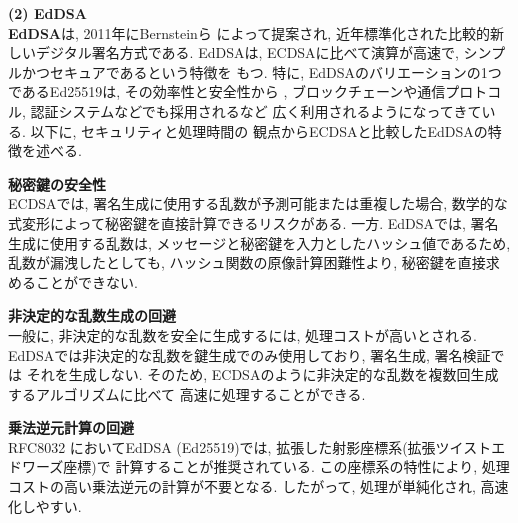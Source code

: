 \documentclass[a4j,9pt,twocolumn]{jsarticle}
\begin{document}
\noindent\textbf{(2) EdDSA}\\
\indent \textbf{EdDSA}は,  2011年にBernsteinら\cite{eddsa}
によって提案され, 近年標準化された比較的新しいデジタル署名方式である. 
EdDSAは, ECDSAに比べて演算が高速で, シンプルかつセキュアであるという特徴を
もつ. 特に, EdDSAのバリエーションの1つであるEd25519は, その効率性と安全性から
, ブロックチェーンや通信プロトコル, 認証システムなどでも採用されるなど
広く利用されるようになってきている. 以下に, セキュリティと処理時間の
観点からECDSAと比較したEdDSAの特徴を述べる.
\smallskip
\begin{description}[labelwidth=3mm, labelsep=2mm]
    \item[(i)] \textbf{秘密鍵の安全性}\\
    ECDSAでは, 署名生成に使用する乱数が予測可能または重複した場合, 
    数学的な式変形によって秘密鍵を直接計算できるリスクがある. 一方. EdDSAでは, 
    署名生成に使用する乱数は, メッセージと秘密鍵を入力としたハッシュ値であるため, 
    乱数が漏洩したとしても, ハッシュ関数の原像計算困難性より, 
    秘密鍵を直接求めることができない. 
\end{description}
\smallskip
\begin{description}[labelwidth=3mm, labelsep=2mm]
    \item[(ii)] \textbf{非決定的な乱数生成の回避}\\
    一般に, 非決定的な乱数を安全に生成するには, 処理コストが高いとされる.
    EdDSAでは非決定的な乱数を鍵生成でのみ使用しており, 署名生成, 署名検証では
    それを生成しない. そのため, ECDSAのように非決定的な乱数を複数回生成するアルゴリズムに比べて
    高速に処理することができる.
\end{description}
\smallskip
\begin{description}[labelwidth=3mm, labelsep=2mm]
    \item[(iii)] \textbf{乗法逆元計算の回避}\\
    RFC8032 \cite{8032}においてEdDSA (Ed25519)では, 拡張した射影座標系(拡張ツイストエドワーズ座標)で
    計算することが推奨されている.
    この座標系の特性により, 処理コストの高い乗法逆元の計算が不要となる.
    したがって, 処理が単純化され,  高速化しやすい. 
\end{description}
\end{document}
